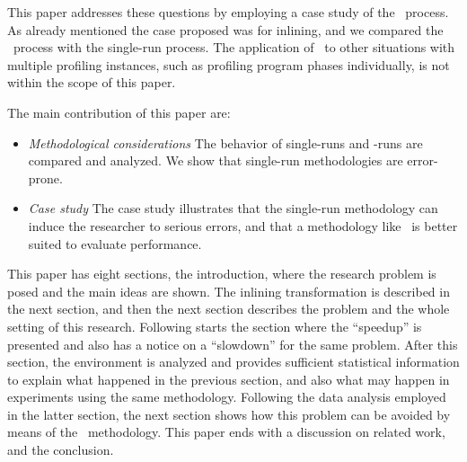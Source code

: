 This paper addresses these questions by employing a case study of the \CP\ process. As already mentioned the case proposed was for inlining, and we compared the \CP\ process with the single-run process. The application of \CP\ to other situations with multiple profiling instances, such as profiling program phases individually, is not within the scope of this paper.


The main contribution of this paper are:
\begin{itemize}
\item {\it Methodological considerations} The behavior of single-runs and \CP-runs are compared and analyzed. We show that single-run methodologies are error-prone.

\item {\it Case study} The case study illustrates that the single-run methodology can induce the researcher to serious errors, and that a methodology like \CP\ is better suited to evaluate performance.

\end{itemize}


This paper has eight sections, the introduction, where the research problem is posed and the main ideas are shown. The inlining transformation is described in the next section, and then the next section describes the problem and the whole setting of this research. Following starts the section where the ``speedup'' is presented and also has a notice on a ``slowdown'' for the same problem. After this section, the environment is analyzed and provides sufficient statistical information to explain what happened in the previous section, and also what may happen in experiments using the same methodology. Following the data analysis employed in the latter section, the next section shows how this problem can be avoided by means of the \CP\ methodology. This paper ends with a discussion on related work, and the conclusion.
